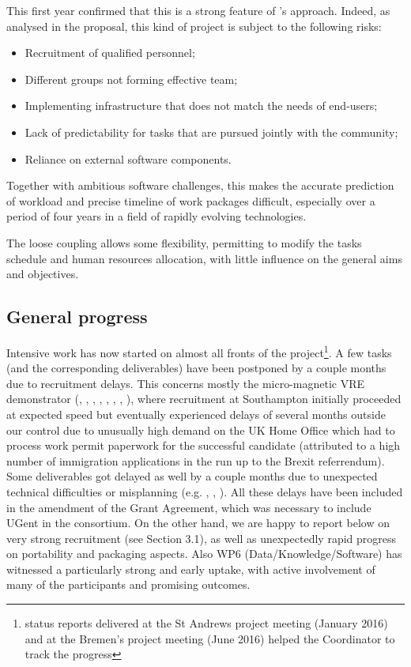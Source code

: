 \documentclass{deliverablereport}
\begin{document}
This first year confirmed that this is a strong feature of \ODK's
approach. Indeed, as analysed in the proposal, this kind of project is
subject to the following risks:
\begin{itemize}
\item Recruitment of qualified personnel;
\item Different groups not forming effective team;
\item Implementing infrastructure that does not match the needs of end-users;
\item Lack of predictability for tasks that are pursued jointly with
  the community;
\item Reliance on external software components.
\end{itemize}
Together with ambitious software challenges, this makes the accurate
prediction of workload and precise timeline of work packages
difficult, especially over a period of four years in a field of
rapidly evolving technologies.

The loose coupling allows some flexibility,
permitting to modify the tasks schedule and human resources allocation,
with little influence on the general aims and objectives.

\subsection{General progress}

Intensive work has now started on almost all fronts of the
project\footnote{status reports delivered at the St Andrews project
  meeting (January 2016) and at the Bremen's project meeting (June
  2016) helped the Coordinator to track the progress}. A few tasks
(and the corresponding deliverables) have been postponed by a couple
months due to recruitment delays. This concerns mostly the
micro-magnetic VRE demonstrator
(,
,
,
,
,
,
,
), where recruitment
at Southampton initially proceeded at expected speed but eventually
experienced delays of several months outside our control due to unusually high demand on the UK Home
Office which had to process work permit paperwork for
the successful candidate (attributed to a high number of immigration applications in the run up to the
Brexit referrendum). Some deliverables got
delayed as well by a couple months due to unexpected technical
difficulties or misplanning (e.g. ,
, ). All
these delays have been included in the amendment of the Grant
Agreement, which was necessary to include UGent in the
consortium. On the other hand, we are happy to report below on very
strong recruitment (see Section 3.1), as well as unexpectedly rapid
progress on portability and packaging aspects. Also WP6
(Data/Knowledge/Software) has witnessed a particularly strong and
early uptake, with active involvement of many of the participants and
promising outcomes.
\end{document}
